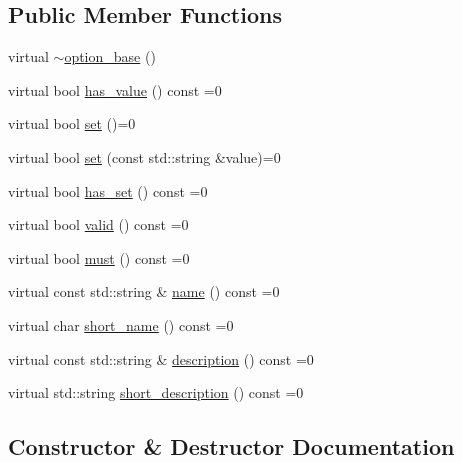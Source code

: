 \subsection*{Public Member Functions}
\begin{DoxyCompactItemize}
\item 
virtual \mbox{\hyperlink{classcmdline_1_1parser_1_1option__base_acf2cd8b8f08c20a16691228e3592b05b}{$\sim$option\+\_\+base}} ()
\item 
virtual bool \mbox{\hyperlink{classcmdline_1_1parser_1_1option__base_a6617c8ff8b2864e8cf3182ca76f7e7ac}{has\+\_\+value}} () const =0
\item 
virtual bool \mbox{\hyperlink{classcmdline_1_1parser_1_1option__base_a6729965a4221ba0112ca04f8550fce5c}{set}} ()=0
\item 
virtual bool \mbox{\hyperlink{classcmdline_1_1parser_1_1option__base_a60444de6a257a3cca44a7a687a1d16fd}{set}} (const std\+::string \&value)=0
\item 
virtual bool \mbox{\hyperlink{classcmdline_1_1parser_1_1option__base_aa948d89b57f4cd901bc20075ec277a04}{has\+\_\+set}} () const =0
\item 
virtual bool \mbox{\hyperlink{classcmdline_1_1parser_1_1option__base_ae0f802a846608195166bc5ad925462e2}{valid}} () const =0
\item 
virtual bool \mbox{\hyperlink{classcmdline_1_1parser_1_1option__base_aa12b58243643ca229983f5dcd5b0b82e}{must}} () const =0
\item 
virtual const std\+::string \& \mbox{\hyperlink{classcmdline_1_1parser_1_1option__base_a30b43cdce34669f4cbc7de9d506416e7}{name}} () const =0
\item 
virtual char \mbox{\hyperlink{classcmdline_1_1parser_1_1option__base_aeea790198b8097ccb98a5a9063d3c81f}{short\+\_\+name}} () const =0
\item 
virtual const std\+::string \& \mbox{\hyperlink{classcmdline_1_1parser_1_1option__base_adf2d7c92405305411ab6bc0d0b860d61}{description}} () const =0
\item 
virtual std\+::string \mbox{\hyperlink{classcmdline_1_1parser_1_1option__base_a091cab2d9f8e85a8e5e1a1a11e274aff}{short\+\_\+description}} () const =0
\end{DoxyCompactItemize}


\subsection{Constructor \& Destructor Documentation}
\mbox{\label{classcmdline_1_1parser_1_1option__base_acf2cd8b8f08c20a16691228e3592b05b}} 
